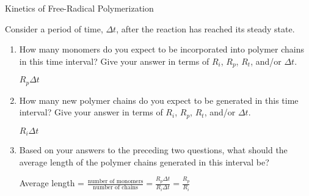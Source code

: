 \begin{activity}{Kinetics of Free-Radical Polymerization}
\begin{ctqs}
\begin{enumerate}
				\begin{solution}[1.5in]\studentdisplay{~}\end{solution}
			
		\end{enumerate}
	
	\question Consider a period of time, $\Delta t$, after the reaction has reached its steady state.
	
		\begin{enumerate}
			
			\item How many monomers do you expect to be incorporated into polymer chains in this time interval?  Give your answer in terms of $R_i$, $R_p$, $R_t$, and/or $\Delta t$.
			
				\begin{solution}[0.5in]
				
					$R_p \Delta t$
					
				\end{solution}
			
			\item How many new polymer chains do you expect to be generated in this time interval?  Give your answer in terms of $R_i$, $R_p$, $R_t$, and/or $\Delta t$.
			
				\begin{solution}[0.5in]
				
					$R_i \Delta t$
					
				\end{solution}
			
			\item Based on your answers to the preceding two questions, what should the average length of the polymer chains generated in this interval be?
			
				\begin{solution}[0.75in]
				
					Average length = $\frac{\text{number of monomers}}{\text{number of chains}} = \frac{R_p\Delta t}{R_i \Delta t} = \frac{R_p}{R_i}$				
				
				\end{solution}
				

\end{enumerate}
\end{ctqs}
\end{activity}

